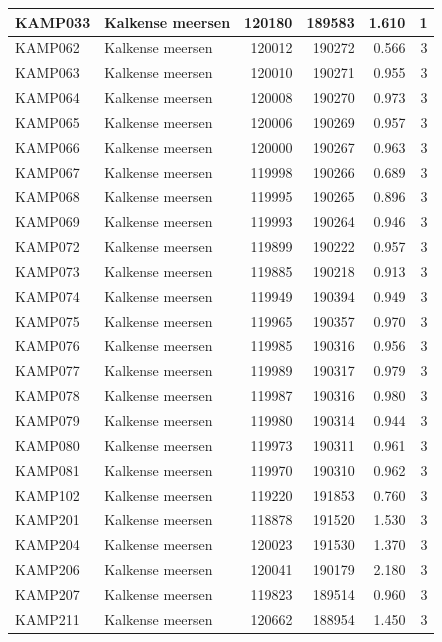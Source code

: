 \documentclass[11pt,]{book}
\begin{document}
\begin{table}
\begin{tabular}[t]{l|l|r|r|r|r}
\hline
KAMP033 & Kalkense meersen & 120180 & 189583 & 1.610 & 1\\
\hline
KAMP062 & Kalkense meersen & 120012 & 190272 & 0.566 & 3\\
\hline
KAMP063 & Kalkense meersen & 120010 & 190271 & 0.955 & 3\\
\hline
KAMP064 & Kalkense meersen & 120008 & 190270 & 0.973 & 3\\
\hline
KAMP065 & Kalkense meersen & 120006 & 190269 & 0.957 & 3\\
\hline
KAMP066 & Kalkense meersen & 120000 & 190267 & 0.963 & 3\\
\hline
KAMP067 & Kalkense meersen & 119998 & 190266 & 0.689 & 3\\
\hline
KAMP068 & Kalkense meersen & 119995 & 190265 & 0.896 & 3\\
\hline
KAMP069 & Kalkense meersen & 119993 & 190264 & 0.946 & 3\\
\hline
KAMP072 & Kalkense meersen & 119899 & 190222 & 0.957 & 3\\
\hline
KAMP073 & Kalkense meersen & 119885 & 190218 & 0.913 & 3\\
\hline
KAMP074 & Kalkense meersen & 119949 & 190394 & 0.949 & 3\\
\hline
KAMP075 & Kalkense meersen & 119965 & 190357 & 0.970 & 3\\
\hline
KAMP076 & Kalkense meersen & 119985 & 190316 & 0.956 & 3\\
\hline
KAMP077 & Kalkense meersen & 119989 & 190317 & 0.979 & 3\\
\hline
KAMP078 & Kalkense meersen & 119987 & 190316 & 0.980 & 3\\
\hline
KAMP079 & Kalkense meersen & 119980 & 190314 & 0.944 & 3\\
\hline
KAMP080 & Kalkense meersen & 119973 & 190311 & 0.961 & 3\\
\hline
KAMP081 & Kalkense meersen & 119970 & 190310 & 0.962 & 3\\
\hline
KAMP102 & Kalkense meersen & 119220 & 191853 & 0.760 & 3\\
\hline
KAMP201 & Kalkense meersen & 118878 & 191520 & 1.530 & 3\\
\hline
KAMP204 & Kalkense meersen & 120023 & 191530 & 1.370 & 3\\
\hline
KAMP206 & Kalkense meersen & 120041 & 190179 & 2.180 & 3\\
\hline
KAMP207 & Kalkense meersen & 119823 & 189514 & 0.960 & 3\\
\hline
KAMP211 & Kalkense meersen & 120662 & 188954 & 1.450 & 3\\

\end{tabular}
\end{table}
\end{document}

